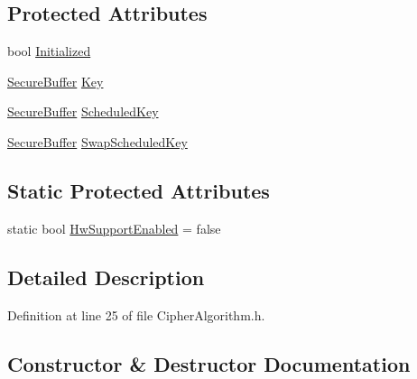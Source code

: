 \subsection*{Protected Attributes}
\begin{DoxyCompactItemize}
\item 
bool \hyperlink{class_gost_crypt_1_1_volume_1_1_cipher_algorithm_af7770384d8409b159b8a0b5f8681036e}{Initialized}
\item 
\hyperlink{class_gost_crypt_1_1_secure_buffer}{Secure\+Buffer} \hyperlink{class_gost_crypt_1_1_volume_1_1_cipher_algorithm_aa4c91f8cb9818ae41baa0463a3adc143}{Key}
\item 
\hyperlink{class_gost_crypt_1_1_secure_buffer}{Secure\+Buffer} \hyperlink{class_gost_crypt_1_1_volume_1_1_cipher_algorithm_a489aa56556ee0b81b588873e3b7df585}{Scheduled\+Key}
\item 
\hyperlink{class_gost_crypt_1_1_secure_buffer}{Secure\+Buffer} \hyperlink{class_gost_crypt_1_1_volume_1_1_cipher_algorithm_a7254787df7fb783cc00e39a772751bcb}{Swap\+Scheduled\+Key}
\end{DoxyCompactItemize}
\subsection*{Static Protected Attributes}
\begin{DoxyCompactItemize}
\item 
static bool \hyperlink{class_gost_crypt_1_1_volume_1_1_cipher_algorithm_ac535fb245b3bf71b80fde9784230ae97}{Hw\+Support\+Enabled} = false
\end{DoxyCompactItemize}


\subsection{Detailed Description}


Definition at line 25 of file Cipher\+Algorithm.\+h.



\subsection{Constructor \& Destructor Documentation}
\mbox{\label{class_gost_crypt_1_1_volume_1_1_cipher_algorithm_abc36f48a14473f9742a3e1dfc43dfd76}} 
